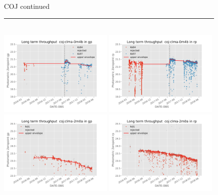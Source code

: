 \documentclass[draft]{spieman}
\begin{document}
\begin{figure}\ContinuedFloat
\centering 
COJ continued \\ 
\rule{\textwidth}{0.4pt} \\
\includegraphics[width=0.49\textwidth]{images/photzptrend-coj-clma-0m4b-gp.png} \hspace*{\fill}
\includegraphics[width=0.49\textwidth]{images/photzptrend-coj-clma-0m4b-rp.png} \\
\includegraphics[width=0.49\textwidth]{images/photzptrend-coj-clma-2m0a-gp.png} \hspace*{\fill}
\includegraphics[width=0.49\textwidth]{images/photzptrend-coj-clma-2m0a-rp.png} \\ 

\end{figure}
\end{document}
